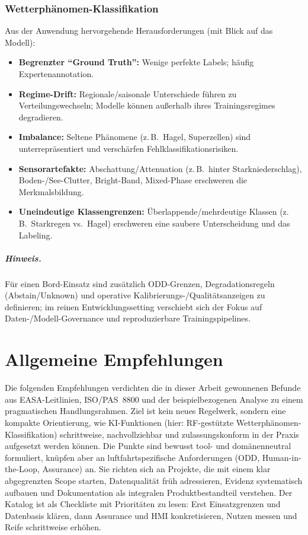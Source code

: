 \subsection{Wetterphänomen-Klassifikation}
Aus der Anwendung hervorgehende Herausforderungen (mit Blick auf das Modell):
\begin{itemize}
  \item \textbf{Begrenzter ``Ground Truth'':} Wenige perfekte Labels; häufig Expertenannotation.
  \item \textbf{Regime-Drift:} Regionale/saisonale Unterschiede führen zu Verteilungswechseln; Modelle können außerhalb ihres Trainingsregimes degradieren.
  \item \textbf{Imbalance:} Seltene Phänomene (z.\,B.\ Hagel, Superzellen) sind unterrepräsentiert und verschärfen Fehlklassifikationsrisiken.
  \item \textbf{Sensorartefakte:} Abschattung/Attenuation (z.\,B.\ hinter Starkniederschlag), Boden-/See-Clutter, Bright-Band, Mixed-Phase erschweren die Merkmalsbildung.
  \item \textbf{Uneindeutige Klassengrenzen:} Überlappende/mehrdeutige Klassen (z.\,B.\ Starkregen vs.\ Hagel) erschweren eine saubere Unterscheidung und das Labeling.
\end{itemize}


\paragraph{Hinweis.}
Für einen Bord-Einsatz sind zusätzlich ODD-Grenzen, Degradationsregeln (Abstain/Unknown) und operative Kalibrierungs-/Qualitätsanzeigen zu definieren; im reinen Entwicklungssetting verschiebt sich der Fokus auf Daten-/Modell-Governance und reproduzierbare Trainingspipelines.


\chapter{Allgemeine Empfehlungen}\label{chap:empfehlungen}

Die folgenden Empfehlungen verdichten die in dieser Arbeit gewonnenen Befunde aus EASA-Leitlinien,
ISO/PAS~8800 und der beispielbezogenen Analyse zu einem pragmatischen Handlungsrahmen.
Ziel ist kein neues Regelwerk, sondern eine kompakte Orientierung, wie KI-Funktionen (hier: RF-gestützte
Wetterphänomen-Klassifikation) schrittweise, nachvollziehbar und zulassungskonform in der Praxis
aufgesetzt werden können. Die Punkte sind bewusst tool- und domänenneutral formuliert, knüpfen
aber an luftfahrtspezifische Anforderungen (ODD, Human-in-the-Loop, Assurance) an. Sie richten sich
an Projekte, die mit einem klar abgegrenzten Scope starten, Datenqualität früh adressieren, Evidenz
systematisch aufbauen und Dokumentation als integralen Produktbestandteil verstehen. Der Katalog ist
als Checkliste mit Prioritäten zu lesen: Erst Einsatzgrenzen und Datenbasis klären, dann
Assurance und HMI konkretisieren, Nutzen messen und Reife schrittweise erhöhen.


